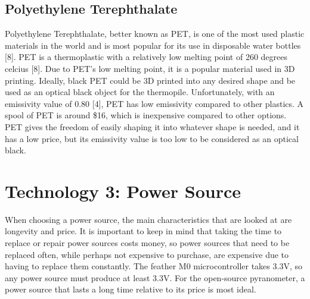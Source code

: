 \documentclass[10pt,draftclsnofoot,onecolumn,letterpaper]{article}
\begin{document}
\subsection{Polyethylene Terephthalate}
Polyethylene Terephthalate, better known as PET, is one of the most used plastic materials in the world and is most popular for its use in disposable water bottles [8]. PET is a thermoplastic with a relatively low melting point of 260 degrees celcius [8]. Due to PET's low melting point, it is a popular material used in 3D printing. Ideally, black PET could be 3D printed into any desired shape and be used as an optical black object for the thermopile. Unfortunately, with an emissivity value of 0.80 [4], PET has low emissivity compared to other plastics. A spool of PET is around \$16, which is inexpensive compared to other options. PET gives the freedom of easily shaping it into whatever shape is needed, and it has a low price, but its emissivity value is too low to be considered as an optical black.

\section{Technology 3: Power Source}
When choosing a power source, the main characteristics that are looked at are longevity and price. It is important to keep in mind that taking the time to replace or repair power sources costs money, so power sources that need to be replaced often, while perhaps not expensive to purchase, are expensive due to having to replace them constantly. The feather M0 microcontroller takes 3.3V, so any power source must produce at least 3.3V. For the open-source pyranometer, a power source that lasts a long time relative to its price is most ideal.
\end{document}
